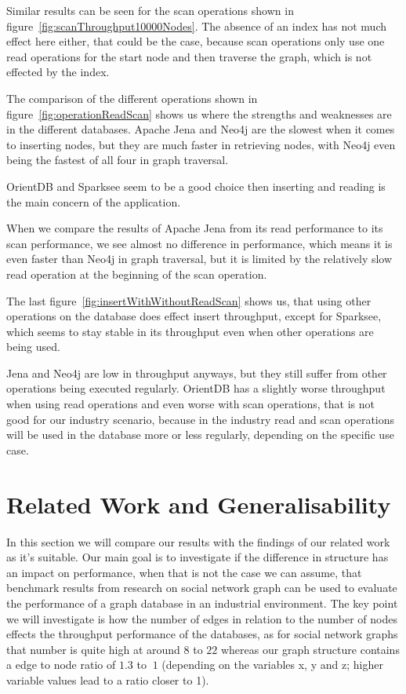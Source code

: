 Similar results can be seen for the scan operations shown in figure~\ref{fig:scanThroughput10000Nodes}.
The absence of an index has not much effect here either,
that could be the case,
because scan operations only use one read operations for the start node and then traverse the graph,
which is not effected by the index.

The comparison of the different operations shown in figure~\ref{fig:operationReadScan} shows us where the strengths and weaknesses are in the different databases.
Apache Jena and Neo4j are the slowest when it comes to inserting nodes,
but they are much faster in retrieving nodes,
with Neo4j even being the fastest of all four in graph traversal.

OrientDB and Sparksee seem to be a good choice then inserting and reading is the main concern of the application.

When we compare the results of Apache Jena from its read performance to its scan performance,
we see almost no difference in performance,
which means it is even faster than Neo4j in graph traversal,
but it is limited by the relatively slow read operation at the beginning of the scan operation.

The last figure~\ref{fig:insertWithWithoutReadScan} shows us,
that using other operations on the database does effect insert throughput,
except for Sparksee,
which seems to stay stable in its throughput even when other operations are being used.

Jena and Neo4j are low in throughput anyways,
but they still suffer from other operations being executed regularly.
OrientDB has a slightly worse throughput when using read operations and even worse with scan operations,
that is not good for our industry scenario,
because in the industry read and scan operations will be used in the database more or less regularly,
depending on the specific use case.

\section{Related Work and Generalisability}
\label{ch:evaluation:se:relatedWorkAndGeneralisability}
In this section we will compare our results with the findings of our related work as it's suitable.
Our main goal is to investigate if the difference in structure has an impact on performance,
when that is not the case we can assume,
that benchmark results from research on social network graph can be used to evaluate the performance of a graph database in an industrial environment.
The key point we will investigate is how the number of edges in relation to the number of nodes effects the throughput performance of the databases,
as for social network graphs that number is quite high at around $ 8 $\cite[41]{TaoShen} to $ 22 $\cite{Dayarathna2012} whereas our graph structure contains a edge to node ratio of $ 1.3 $ to $ ~1 $ (depending on the variables x, y and z; higher variable values lead to a ratio closer to 1).

